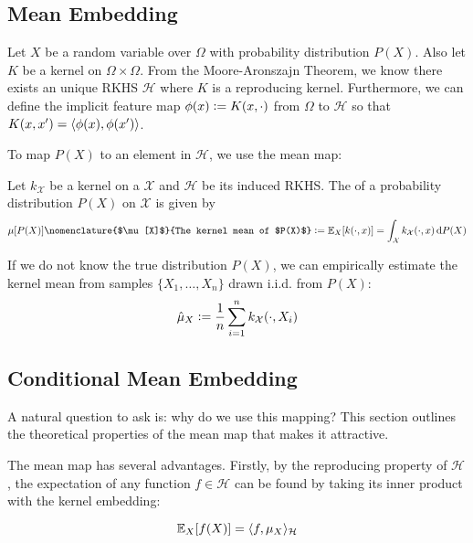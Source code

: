 \subsection{Mean Embedding}
Let $X$ be a random variable over $\Omega$ with probability distribution $P(X)$. Also let $K$ be a kernel on $\Omega \times \Omega$. From the Moore-Aronszajn Theorem, we know there exists an unique RKHS $\mathcal{H}$ where $K$ is a reproducing kernel. Furthermore, we can define the implicit feature map $\phi(x) \vcentcolon= K(x, \cdot)$ from $\Omega$ to $\mathcal{H}$ so that $K(x, x^\prime) = \langle\phi(x), \phi(x^\prime)\rangle$.

To map $P(X)$ to an element in $\mathcal{H}$, we use the mean map:
%
\begin{definition}
Let $k_\mathcal{X}$ be a kernel on a  $\mathcal{X}$ and $\mathcal{H}$ be its induced RKHS. The  of a probability distribution $P(X)$ on $\mathcal{X}$ is given by
%
\begin{equation}
  \mu[P(X)]\nomenclature{$\mu[X]$}{The kernel mean of $P(X)$} \defeq \E_X[k(\cdot, x)] = \int_\mathcal{X} k_\mathcal{X}(\cdot, x) \,\mathrm{d}P(X)
\end{equation}
\end{definition}
%
If we do not know the true distribution $P(X)$, we can empirically estimate the kernel mean from samples $\{ X_1, \dotsc, X_n \}$ drawn i.i.d. from $P(X)$:
%
\begin{equation}
   \hat{\mu}_{X} \vcentcolon= \frac{1}{n} \sum_{i=1}^n k_\mathcal{X}(\cdot, X_i)
\end{equation}

\subsection{Conditional Mean Embedding}
A natural question to ask is: why do we use this mapping? This section outlines the theoretical properties of the mean map that makes it attractive.

The mean map has several advantages. Firstly, by the reproducing property of $\mathcal{H}$, the expectation of any function $f \in \mathcal{H}$ can be found by taking its inner product with the kernel embedding:

\begin{equation}
\mathbb{E}_X[f(X)] = \langle f, \mu_X\rangle_\mathcal{H}
\end{equation}

